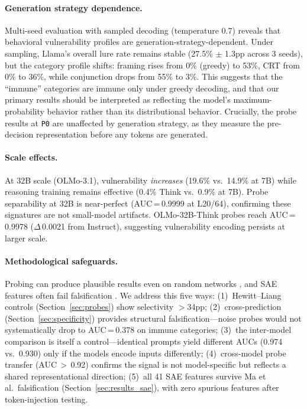 \documentclass[accepted]{article}
\newcommand{\pzero}{\texttt{P0}}
\begin{document}
\paragraph{Generation strategy dependence.}
Multi-seed evaluation with sampled decoding (temperature 0.7) reveals that
behavioral vulnerability profiles are generation-strategy-dependent.  Under
sampling, Llama's overall lure rate remains stable (27.5\% $\pm$ 1.3pp across
3 seeds), but the category profile shifts: framing rises from 0\% (greedy) to
53\%, CRT from 0\% to 36\%, while conjunction drops from 55\% to 3\%.  This
suggests that the ``immune'' categories are immune only under greedy decoding,
and that our primary results should be interpreted as reflecting the model's
maximum-probability behavior rather than its distributional behavior.
Crucially, the probe results at \pzero{} are unaffected by generation strategy,
as they measure the pre-decision representation before any tokens are generated.

\paragraph{Scale effects.}
At 32B scale (OLMo-3.1), vulnerability \emph{increases} (19.6\% vs.\ 14.9\% at 7B) while reasoning training remains effective (0.4\% Think vs.\ 0.9\% at 7B).  Probe separability at 32B is near-perfect (AUC\,=\,0.9999 at L20/64), confirming these signatures are not small-model artifacts.  OLMo-32B-Think probes reach AUC\,=\,0.9978 ($\Delta$\,0.0021 from Instruct), suggesting vulnerability encoding persists at larger scale.

\paragraph{Methodological safeguards.}
Probing can produce plausible results even on random networks
\citep{meloux2025dead}, and SAE features often fail falsification
\citep{sanitychecks2026}.  We address this five ways: (1)~Hewitt--Liang
controls (Section~\ref{sec:probes}) show selectivity $>$34pp;
(2)~cross-prediction (Section~\ref{sec:specificity}) provides structural
falsification---noise probes would not systematically drop to
AUC\,=\,0.378 on immune categories; (3)~the inter-model comparison is
itself a control---identical prompts yield different AUCs (0.974
vs.\ 0.930) only if the models encode inputs differently;
(4)~cross-model probe transfer (AUC\,$>$\,0.92) confirms the signal is
not model-specific but reflects a shared representational direction;
(5)~all 41 SAE features survive Ma et al.\ falsification
(Section~\ref{sec:results_sae}), with zero spurious features after
token-injection testing.
\end{document}
